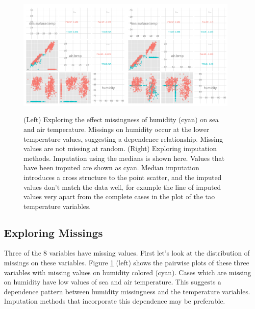 \documentclass[article]{jss}
\begin{document}
\begin{figure}[htp]
\centerline{\includegraphics[width=0.49\textwidth]{tao1_pairwise.png}\includegraphics[width=0.49\textwidth]{tao2_pairwise.png}}
\caption{(Left) Exploring the effect missingness of humidity (cyan) on sea and air temperature. Missings on humidity occur at the lower temperature values, suggesting a dependence relationship. Missing values are not missing at random. (Right) Exploring imputation methods. Imputation using the medians is shown here. Values that have been imputed are shown as cyan. Median imputation introduces a cross structure to the point scatter, and the imputed values don't match the data well, for example the line of imputed values very apart from the complete cases in the plot of the tao temperature variables.}
\label{tao1}
\end{figure}

\subsection{Exploring Missings}

Three of the 8 variables have missing values. First let's look at the distribution of missings on these variables. Figure \ref{tao1} (left) shows the pairwise plots of these three variables with missing values on humidity colored (cyan). Cases which are missing on humidity have  low values of sea and air temperature. This suggests a dependence pattern between humidity missingness and the temperature variables. Imputation methods that incorporate this dependence may be preferable.
\end{document}
